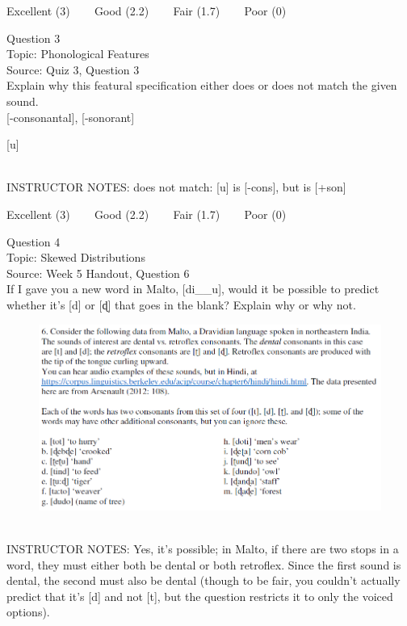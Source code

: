 \documentclass[12pt]{article}
\begin{document}
\vfill
Excellent (3) ~~~ Good (2.2) ~~~ Fair (1.7) ~~~ Poor (0)
\newpage

{\large Question 3}\\

Topic: Phonological Features\\
Source: Quiz 3, Question 3\\

Explain why this featural specification either does or does not match the given sound.\\

{[-consonantal]}, {[-sonorant]}

{[u]}


~\\
INSTRUCTOR NOTES: does not match: [u] is [-cons], but is [+son]


\vfill
Excellent (3) ~~~ Good (2.2) ~~~ Fair (1.7) ~~~ Poor (0)
\newpage

{\large Question 4}\\

Topic: Skewed Distributions\\
Source: Week 5 Handout, Question 6\\

If I gave you a new word in Malto, [di\_\_u], would it be possible to predict whether it's [d] or [ɖ] that goes in the blank? Explain why or why not.\\

\begin{figure}[H]
\includegraphics{../images/malto.png}
\end{figure}

~\\
INSTRUCTOR NOTES: Yes, it's possible; in Malto, if there are two stops in a word, they must either both be dental or both retroflex. Since the first sound is dental, the second must also be dental (though to be fair, you couldn't actually predict that it's [d] and not [t], but the question restricts it to only the voiced options).
\end{document}
